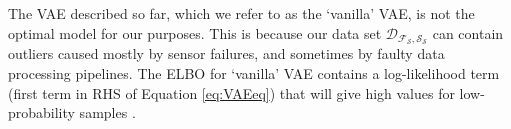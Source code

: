 


The VAE described so far, which we refer to as the `vanilla' VAE, is not the optimal model for our purposes.%
This is because our data set $\mathcal{D_{F_S,S_S}}$ %
can contain outliers caused mostly by sensor failures, and sometimes by faulty data processing pipelines. The ELBO for `vanilla' VAE contains a log-likelihood term (first term in RHS of Equation \ref{eq:VAEeq}) that will give high values for low-probability samples \citep{akrami2019robustvae}. %

